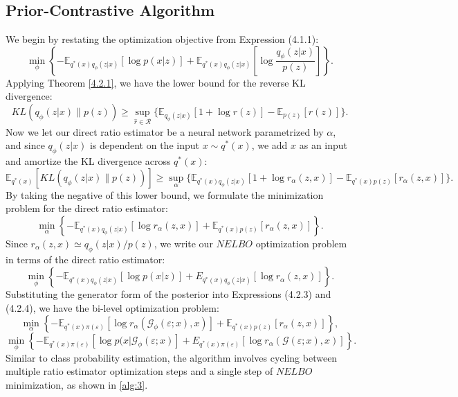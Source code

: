 \documentclass[honours,12pt, twoside]{unswthesis}
\newcommand{\E}{\mathbb{E}}
\numberwithin{equation}{section}
\theoremstyle{definition}
\begin{document}
\subsection{Prior-Contrastive Algorithm}\label{sec:4.2.2}
We begin by restating the optimization objective from Expression (4.1.1):
\[\min_\phi \left\lbrace-\mathbb{E}_{q^*(x)q_\phi(z|x)}[\log p(x|z)]+\mathbb{E}_{q^*(x)q_\phi(z|x)}\left[\log \frac{q_\phi(z|x)}{p(z)}\right]\right\rbrace.\]
Applying Theorem \ref{4.2.1}, we have the lower bound for the reverse KL divergence:
\[KL(q_\phi(z|x)\|p(z))\geq \sup_{\hat{r}\in \mathcal{R}}\{\mathbb{E}_{q_\phi(z|x)}[1+\log r(z)]-\mathbb{E}_{p(z)}[r(z)]\}.\]
Now we let our direct ratio estimator be a neural network parametrized by $\alpha$, and since $q_\phi(z|x)$ is dependent on the input $x\sim q^*(x)$, we add $x$ as an input and amortize the KL divergence across $q^*(x)$:
\[\mathbb{E}_{q^*(x)}\left[KL(q_\phi(z|x)\|p(z))\right]\geq \sup_\alpha \{\mathbb{E}_{q^*(x)q_\phi(z|x)}[1+\log r_\alpha(z,x)]-\mathbb{E}_{q^*(x)p(z)}[r_\alpha (z,x)]\}.\]
By taking the negative of this lower bound, we formulate the minimization problem for the direct ratio estimator:
\begin{equation}
\min_\alpha \left\lbrace-\E_{q^*(x)q_\phi(z|x)}[\log r_\alpha(z,x)]+\E_{q^*(x)p(z)}[r_\alpha (z,x)]\right\rbrace.
\end{equation}
Since $r_\alpha(z,x)\simeq q_\phi(z|x)/p(z)$, we write our $NELBO$ optimization problem in terms of the direct ratio estimator:
\begin{equation}
\min_\phi \left\lbrace-\mathbb{E}_{q^*(x)q_\phi(z|x)}\left[\log p(x|z)\right]+E_{q^*(x)q_\phi (z|x)}[\log r_\alpha(z,x)]\right\rbrace.
\end{equation}
Substituting the generator form of the posterior into Expressions (4.2.3) and (4.2.4), we have the bi-level optimization problem:
\[\min_\alpha \left\lbrace-\mathbb{E}_{q^*(x)\pi(\varepsilon)}[\log r_\alpha(\mathcal{G}_\phi(\varepsilon;x),x)]+\mathbb{E}_{q^*(x)p(z)}[r_\alpha(z,x)]\right\rbrace,\]
\[\min_\phi \left\lbrace-\mathbb{E}_{q^*(x)\pi(\varepsilon)}\left[\log p(x|\mathcal{G}_\phi(\varepsilon;x)\right]+E_{q^*(x)\pi(\varepsilon)}[\log r_\alpha(\mathcal{G}(\varepsilon;x),x)]\right\rbrace.\]
Similar to class probability estimation, the algorithm involves cycling between multiple ratio estimator optimization steps and a single step of $NELBO$ minimization, as shown in \autoref{alg:3}.
\end{document}
